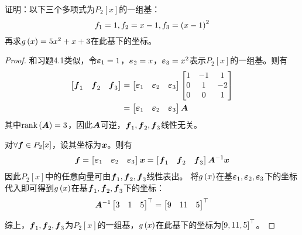 \begin{problem}
证明：以下三个多项式为\(P_2[x]\)的一组基：
\begin{equation*}
    f_1=1,f_2=x-1,f_3=\left( x-1 \right)^2
\end{equation*}
再求\(g\left( x \right)=5x^2+x+3\)在此基下的坐标。
\end{problem}
\begin{proof}
    和习题4.1类似，令\(\boldsymbol{\varepsilon}_1=1\)，\(\boldsymbol{\varepsilon}_2=x\)，\(\boldsymbol{\varepsilon}_3=x^2\)表示\(P_2[x]\)的一组基。则有
    \begin{align*}
        \begin{bmatrix}
            \boldsymbol{f}_1 & \boldsymbol{f}_2 & \boldsymbol{f}_3
        \end{bmatrix}
         & =
        \begin{bmatrix}
            \boldsymbol{\varepsilon}_1 & \boldsymbol{\varepsilon}_2 & \boldsymbol{\varepsilon}_3
        \end{bmatrix}
        \begin{bmatrix}
            1 & -1 & 1  \\
            0 & 1  & -2 \\
            0 & 0  & 1
        \end{bmatrix} \\
         & =
        \begin{bmatrix}
            \boldsymbol{\varepsilon}_1 & \boldsymbol{\varepsilon}_2 & \boldsymbol{\varepsilon}_3
        \end{bmatrix}\boldsymbol{A}
    \end{align*}
    其中\(\mathrm{rank}\left( \boldsymbol{A} \right)=3\)，因此\(\boldsymbol{A}\)可逆，\(\boldsymbol{f}_1,\boldsymbol{f}_2,\boldsymbol{f}_3\)线性无关。

    对\(\forall\boldsymbol{f}\in P_2[x]\)，设其坐标为\(\boldsymbol{x}\)。则有
    \begin{equation*}
        \boldsymbol{f}=
        \begin{bmatrix}
            \boldsymbol{\varepsilon}_1 & \boldsymbol{\varepsilon}_2 & \boldsymbol{\varepsilon}_3
        \end{bmatrix}\boldsymbol{x}=
        \begin{bmatrix}
            \boldsymbol{f}_1 & \boldsymbol{f}_2 & \boldsymbol{f}_3
        \end{bmatrix}{\boldsymbol{A}}^{-1}\boldsymbol{x}
    \end{equation*}
    因此\(P_2[x]\)中的任意向量可由\(\boldsymbol{f}_1,\boldsymbol{f}_2,\boldsymbol{f}_3\)线性表出。
    将\(g\left( x \right)\)在基\(\boldsymbol{\varepsilon}_1,\boldsymbol{\varepsilon}_2,\boldsymbol{\varepsilon}_3\)下的坐标代入即可得到\(g\left( x \right)\)在基\(\boldsymbol{f}_1,\boldsymbol{f}_2,\boldsymbol{f}_3\)下的坐标：
    \begin{equation*}
        {\boldsymbol{A}}^{-1}\begin{bmatrix}3&1&5\end{bmatrix}^\top=\begin{bmatrix}9&11&5\end{bmatrix}^\top
    \end{equation*}

    综上，\(\boldsymbol{f}_1,\boldsymbol{f}_2,\boldsymbol{f}_3\)为\(P_2[x]\)的一组基，\(g\left( x \right)\)在此基下的坐标为\(\left[ 9,11,5 \right]^\top\)。
\end{proof}

